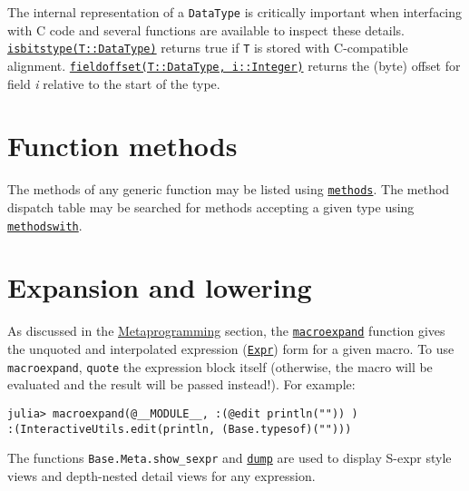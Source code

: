 The internal representation of a \texttt{DataType} is critically important when interfacing with C code and several functions are available to inspect these details. \hyperlink{16222127093346839171}{\texttt{isbitstype(T::DataType)}} returns true if \texttt{T} is stored with C-compatible alignment. \hyperlink{6956980533195055227}{\texttt{fieldoffset(T::DataType, i::Integer)}} returns the (byte) offset for field \emph{i} relative to the start of the type.



\hypertarget{9741782790992203943}{}


\section{Function methods}



The methods of any generic function may be listed using \hyperlink{3025953302266245919}{\texttt{methods}}. The method dispatch table may be searched for methods accepting a given type using \hyperlink{1845157398882896709}{\texttt{methodswith}}.



\hypertarget{10529563115945815287}{}


\section{Expansion and lowering}



As discussed in the \hyperlink{15430858583934124136}{Metaprogramming} section, the \hyperlink{8018172489611994488}{\texttt{macroexpand}} function gives the unquoted and interpolated expression (\hyperlink{17120496304147995299}{\texttt{Expr}}) form for a given macro. To use \texttt{macroexpand}, \texttt{quote} the expression block itself (otherwise, the macro will be evaluated and the result will be passed instead!). For example:




\begin{verbatim}
julia> macroexpand(@__MODULE__, :(@edit println("")) )
:(InteractiveUtils.edit(println, (Base.typesof)("")))
\end{verbatim}



The functions \texttt{Base.Meta.show\_sexpr} and \hyperlink{15981569052160951906}{\texttt{dump}} are used to display S-expr style views and depth-nested detail views for any expression.



